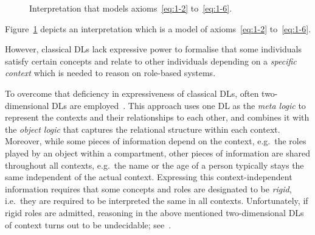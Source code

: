 \documentclass[final]{scrartcl}
\begin{document}
\begin{figure}
  \centering
  \caption{Interpretation that models axioms~\eqref{eq:1-2} to~\eqref{eq:1-6}.}
  \label{fig:dl-example-intro}
\end{figure}

\noindent
Figure~\ref{fig:dl-example-intro} depicts an interpretation which is a model of axioms~\eqref{eq:1-2} to~\eqref{eq:1-6}.


However, classical DLs lack expressive power to formalise that some individuals satisfy certain
concepts and relate to other individuals depending on a \emph{specific context} which is needed to
reason on role-based systems.

To overcome that deficiency in expressiveness of classical DLs, often two-dimensional DLs are
employed~\cite{KG-JELIA10,KLGu-DL-11,KlGu-AAAI11,KG16}. This approach uses one DL \LM as the
\emph{meta logic} to represent the contexts and their relationships to each other, and combines it
with the \emph{object logic} \LO that captures the relational structure within each context.
%
Moreover, while some pieces of information depend on the context, e.g.\ the roles played by an
object within a compartment, other pieces of information are
shared throughout all contexts, e.g.\ the name or the age of a person typically stays the same
independent of the actual context.  Expressing this context-independent information requires that
some concepts and roles are designated to be \emph{rigid}, i.e.~they are required to be interpreted
the same in all contexts.  Unfortunately, if rigid roles are admitted, reasoning in the above
mentioned two-dimensional DLs of context turns out to be undecidable; see~\cite{KG-JELIA10}.
\end{document}
